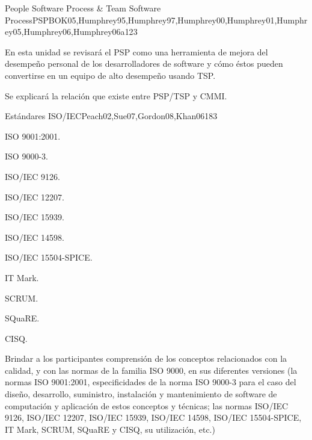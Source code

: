 \begin{syllabus}
\begin{unit}{People Software Process \& Team Software Process}{PSPBOK05,Humphrey95,Humphrey97,Humphrey00,Humphrey01,Humphrey05,Humphrey06,Humphrey06a}{12}{3}
   \begin{learningoutcomes}
      \item En esta unidad se revisará el PSP como una herramienta de mejora del desempeño personal de los desarrolladores de software y cómo éstos pueden convertirse en un equipo de alto desempeño usando TSP.
      \item Se explicará la relación que existe entre PSP/TSP y CMMI.
   \end{learningoutcomes}
\end{unit}

\begin{unit}{Estándares ISO/IEC}{Peach02,Sue07,Gordon08,Khan06}{18}{3}
   \begin{topics}
      \item ISO 9001:2001.
      \item ISO 9000-3.
      \item ISO/IEC 9126.
      \item ISO/IEC 12207.
      \item ISO/IEC 15939.
      \item ISO/IEC 14598.
      \item ISO/IEC 15504-SPICE.
      \item IT Mark.
      \item SCRUM.
      \item SQuaRE.
      \item CISQ.
   \end{topics}

   \begin{learningoutcomes}
      \item Brindar a los participantes comprensión de los conceptos relacionados con la calidad, y con las normas de la familia ISO 9000, en sus diferentes versiones (la normas ISO 9001:2001, especificidades de la norma ISO 9000-3 para el caso del diseño, desarrollo, suministro, instalación y mantenimiento de software de computación y aplicación de estos conceptos y técnicas; las normas ISO/IEC 9126, ISO/IEC 12207, ISO/IEC 15939, ISO/IEC 14598, ISO/IEC 15504-SPICE, IT Mark, SCRUM, SQuaRE y CISQ, su utilización, etc.)
   \end{learningoutcomes}
\end{unit}


\end{syllabus}
